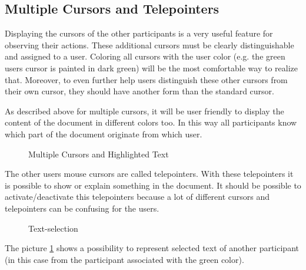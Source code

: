 \documentclass[11pt,a4paper]{article}
\begin{document}
\subsection{Multiple Cursors and Telepointers}
Displaying the cursors of the other participants is a very useful feature for observing their actions. These additional cursors must be clearly distinguishable and assigned to a user. Coloring all cursors with the user color (e.g. the green users cursor is painted in dark green) will be the most comfortable way to realize that. Moreover, to even further help users distinguish these other cursors from their own cursor, they should have another form than the standard cursor.

As described above for multiple cursors, it will be user friendly to display the content of the document in different colors too. In this way all participants know which part of the document originate from which user.
\begin{figure}[H]
 \centering
 \caption{Multiple Cursors and Highlighted Text}
\end{figure}
The other users mouse cursors are called telepointers. With these telepointers it is possible to show or explain something in the document. It should be possible to activate/deactivate this telepointers because a lot of different cursors and telepointers can be confusing for the users.
\begin{figure}[H]
\centering
{}
\caption{Text-selection}
\label{Text-selection}
\end{figure}
The picture \ref{Text-selection} shows a possibility to represent selected text of another participant (in this case from the participant associated with the green color).
\end{document}
